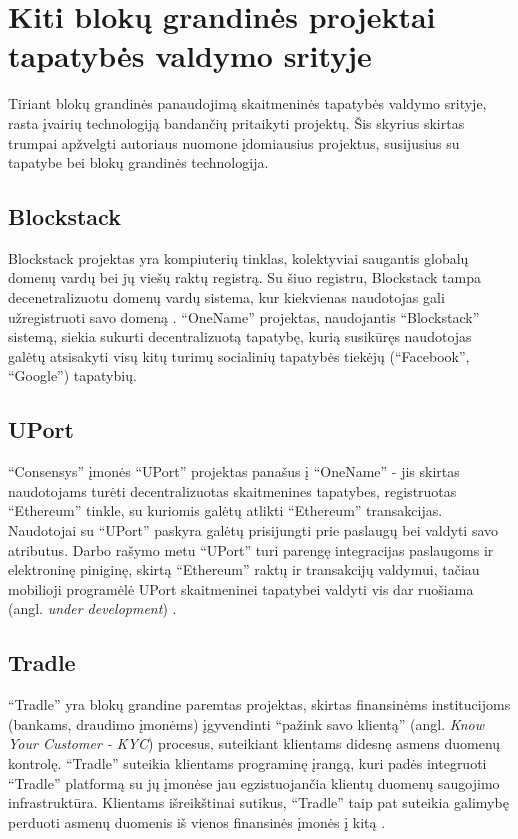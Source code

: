 \section{Kiti blokų grandinės projektai tapatybės valdymo srityje}

Tiriant blokų grandinės panaudojimą skaitmeninės tapatybės valdymo srityje, rasta įvairių
technologiją bandančių pritaikyti projektų. Šis skyrius skirtas trumpai apžvelgti autoriaus nuomone
įdomiausius projektus, susijusius su tapatybe bei blokų grandinės technologija.

\tocless\subsection{Blockstack}

Blockstack projektas yra kompiuterių tinklas, kolektyviai saugantis globalų
domenų vardų bei jų viešų raktų registrą. Su šiuo registru, Blockstack tampa
decenetralizuotu domenų vardų sistema, kur kiekvienas naudotojas gali užregistruoti savo domeną \cite{BlockstackWhitepaper}.
\enquote{OneName} projektas, naudojantis \enquote{Blockstack} sistemą, siekia sukurti decentralizuotą tapatybę,
kurią susikūręs naudotojas galėtų atsisakyti visų kitų turimų socialinių tapatybės tiekėjų (\enquote{Facebook},
\enquote{Google}) tapatybių.

\tocless\subsection{UPort}

\enquote{Consensys} įmonės \enquote{UPort} projektas panašus į \enquote{OneName} - jis skirtas naudotojams turėti decentralizuotas
skaitmenines tapatybes, registruotas \enquote{Ethereum} tinkle, su kuriomis galėtų atlikti \enquote{Ethereum} transakcijas.
Naudotojai su \enquote{UPort} paskyra
galėtų prisijungti prie paslaugų bei valdyti savo atributus. Darbo rašymo metu \enquote{UPort} turi
parengę integracijas paslaugoms ir elektroninę piniginę, skirtą \enquote{Ethereum} raktų
ir transakcijų valdymui, tačiau mobilioji programėlė UPort skaitmeninei tapatybei valdyti vis dar ruošiama (angl.
\textit{under development}) \cite{UPort}.

\tocless\subsection{Tradle}

\enquote{Tradle} yra blokų grandine paremtas projektas, skirtas finansinėms institucijoms (bankams,
draudimo įmonėms) įgyvendinti \enquote{pažink savo klientą} (angl. \textit{Know Your Customer - KYC}) procesus,
suteikiant klientams didesnę asmens duomenų kontrolę. \enquote{Tradle} suteikia
klientams programinę įrangą, kuri padės integruoti \enquote{Tradle} platformą su jų įmonėse jau egzistuojančia klientų duomenų saugojimo
infrastruktūra. Klientams išreikštinai sutikus, \enquote{Tradle} taip pat suteikia galimybę perduoti asmenų duomenis iš vienos
finansinės įmonės į kitą \cite{Baars2016}.